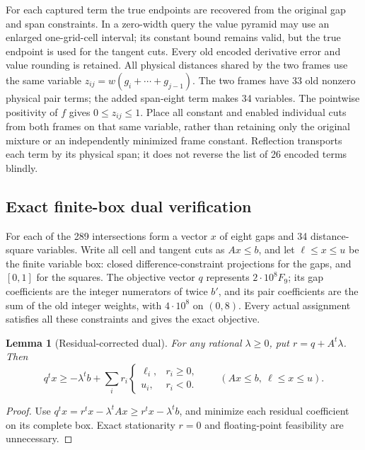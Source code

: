 \documentclass[11pt,a4paper]{article}
\newtheorem{lemma}[theorem]{Lemma}
\theoremstyle{remark}
\begin{document}
For each captured term the true endpoints are recovered from the
original gap and span constraints. In a zero-width query the value
pyramid may use an enlarged one-grid-cell interval; its constant bound
remains valid, but the true endpoint is used for the tangent cuts.
Every old encoded derivative error and value rounding is retained.
All physical distances shared by the two frames use the same variable
$z_{ij}=w(g_i+\cdots+g_{j-1})$. The two frames have 33 old nonzero
physical pair terms; the added span-eight term makes 34 variables.
The pointwise positivity of $f$ gives $0\le z_{ij}\le1$.
Place all constant and enabled individual cuts from both frames on
that same variable, rather than retaining only the original mixture
or an independently minimized frame constant.
Reflection transports each term by its physical span; it does not
reverse the list of 26 encoded terms blindly.

\subsection{Exact finite-box dual verification}

For each of the 289 intersections form a vector $x$ of eight gaps
and 34 distance-square variables. Write all cell and tangent cuts as
$Ax\le b$, and let $\ell\le x\le u$ be the finite variable box:
closed difference-constraint projections for the gaps, and $[0,1]$
for the squares. The objective vector $q$ represents $2\cdot10^8F_9$;
its gap coefficients are the integer numerators of twice $b'$, and
its pair coefficients are the sum of the old integer weights, with
$4\cdot10^8$ on $(0,8)$. Every actual assignment satisfies all these
constraints and gives the exact objective.

\begin{lemma}[Residual-corrected dual]\label{lem:dual}
For any rational $\lambda\ge0$, put $r=q+A^t\lambda$. Then
\[
 q^tx\ge-\lambda^tb+
 \sum_i r_i\begin{cases}\ell_i,&r_i\ge0,\\u_i,&r_i<0.\end{cases}
 \qquad(Ax\le b,\ \ell\le x\le u).
\]
\end{lemma}
\begin{proof}
Use $q^tx=r^tx-\lambda^tAx\ge r^tx-\lambda^tb$,
and minimize each residual coefficient on its complete box.
Exact stationarity $r=0$ and floating-point feasibility are unnecessary.
\end{proof}
\end{document}

